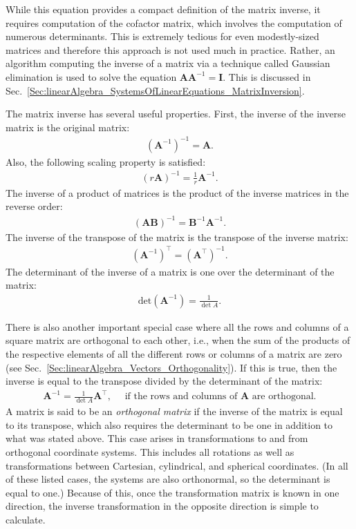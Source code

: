 While this equation provides a compact definition of the matrix inverse, it requires computation of the cofactor matrix, which involves the computation of numerous determinants. This is extremely tedious for even modestly-sized matrices and therefore this approach is not used much in practice. Rather, an algorithm computing the inverse of a matrix via a technique called Gaussian elimination is used to solve the equation $\mathbf{A} \mathbf{A}^{-1}  = \mathbf{I}$. This is discussed in Sec.~\ref{Sec:linearAlgebra_SystemsOfLinearEquations_MatrixInversion}. 

The matrix inverse has several useful properties. First, the inverse of the inverse matrix is the original matrix:
\begin{align}
  ( \mathbf{A}^{-1} )^{-1} = \mathbf{A} .
\end{align}
Also, the following scaling property is satisfied:
\begin{align}
  \left( r \mathbf{A} \right)^{-1} = \frac{1}{r} \mathbf{A}^{-1} .
\end{align}
The inverse of a product of matrices is the product of the inverse matrices in the reverse order:
\begin{align}
  ( \mathbf{AB} )^{-1} = \mathbf{B}^{-1} \mathbf{A}^{-1} .
\end{align}
The inverse of the transpose of the matrix is the transpose of the inverse matrix:
\begin{align}
  \left( \mathbf{A}^{-1} \right)^\top = \left( \mathbf{A}^\top \right)^{-1} .
\end{align}
The determinant of the inverse of a matrix is one over the determinant of the matrix:
\begin{align}
  \mathrm{det} \left( \mathbf{A}^{-1} \right) = \frac{1}{\det{A}} .
\end{align}

There is also another important special case where all the rows and columns of a square matrix are orthogonal to each other, i.e., when the sum of the products of the respective elements of all the different rows or columns of a matrix are zero (see Sec.~\ref{Sec:linearAlgebra_Vectors_Orthogonality}). If this is true, then the inverse is equal to the transpose divided by the determinant of the matrix:
\begin{align}
  \mathbf{A}^{-1} = \frac{1}{\det{A}} \mathbf{A}^\top, \quad \text{ if the rows and columns of $\mathbf{A}$ are orthogonal.}
\end{align}
A matrix is said to be an \emph{orthogonal matrix} if the inverse of the matrix is equal to its transpose, which also requires the determinant to be one in addition to what was stated above. This case arises in transformations to and from orthogonal coordinate systems. This includes all rotations as well as transformations between Cartesian, cylindrical, and spherical coordinates. (In all of these listed cases, the systems are also orthonormal, so the determinant is equal to one.) Because of this, once the transformation matrix is known in one direction, the inverse transformation in the opposite direction is simple to calculate.

